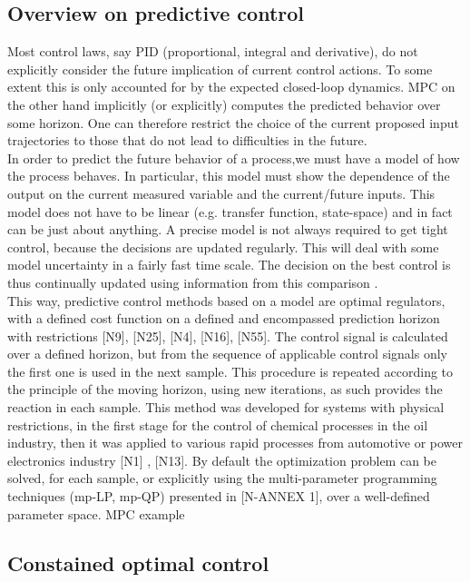 \subsection{Overview on predictive control}\label{BASICCSR:sec:MPCOverview}

Most control laws, say PID (proportional, integral and derivative), do not explicitly consider the future implication of current control actions. To some extent this is only accounted for by the expected closed-loop dynamics. MPC on the other hand
implicitly (or explicitly) computes the predicted behavior over some horizon. One can therefore restrict the choice of the current proposed input trajectories to those that do not lead to difficulties in the future.\\
In order to predict the future behavior of a process,we must have a model of how the process behaves. In particular, this model must show the dependence of the output on the current measured variable and the current/future inputs. This model does not
have to be linear (e.g. transfer function, state-space) and in fact can be just about anything. A precise model is not always required to get tight control, because the decisions are updated regularly. This will deal with some model uncertainty in a fairly
fast time scale. The decision on the best control is thus continually updated using information from this comparison \cite{rossiter2017model}.\\
This way, predictive control methods based on a model are optimal regulators, with a defined cost function on a defined and encompassed  	prediction horizon with restrictions [N9], [N25], [N4], [N16], [N55]. The control signal is calculated over a defined horizon, but from the sequence of applicable control signals only the first one is used in the next sample. This procedure is repeated according to the principle of the moving horizon, using new iterations, as such provides the reaction in each sample. This method was developed for systems with physical restrictions, in the first stage for the control of chemical processes in the oil industry, then it was applied to various rapid processes from automotive or power electronics industry [N1] , [N13]. By default the optimization problem can be solved, for each sample, or explicitly using the multi-parameter programming techniques (mp-LP, mp-QP) presented in [N-ANNEX 1], over a well-defined parameter space.
	MPC example
	
	\subsection{Constained optimal control}\label{BASICCSR:sec:OptimalControl}
	
